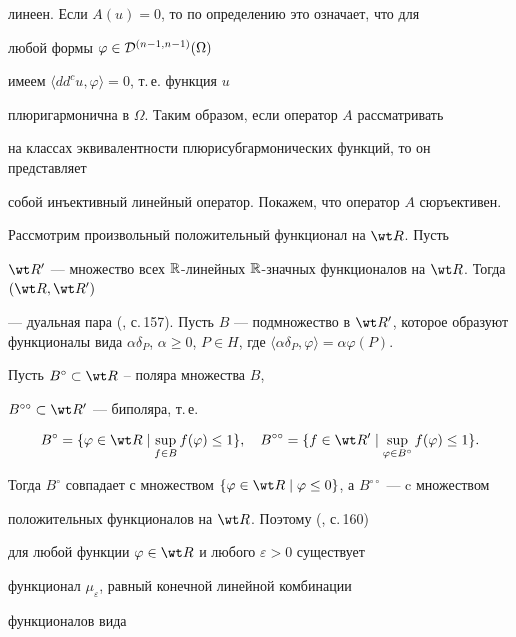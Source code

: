 \begin{pf}
линеен. Если $A(u)=0$, то по определению это означает, что для 


любой формы $\varphi\in {\cal D}^{(n-1,n-1)}(\Omega)$


имеем $\langle dd^cu, \varphi\rangle=0$, т.\,е. функция $u$ 


плюригармонична в $\Omega$. Таким образом, если оператор $A$ рассматривать 


на классах эквивалентности плюрисубгармонических функций, то он представляет 


собой инъективный линейный оператор. Покажем, что оператор $A$ сюръективен. 


Рассмотрим произвольный положительный функционал на $\wt R$. Пусть 


$\wt R^\prime$ --- множество всех $\Bbb R$-линейных $\Bbb 


R$-значных функционалов на $\wt R$. Тогда $(\wt R,\wt R^\prime)$ 


--- дуальная пара (\cite{Schaef}, с.\,157). Пусть $B$ --- подмножество в $\wt 


R^\prime$, которое образуют функционалы вида $\alpha\delta_P$, $\alpha\ge 


0$, $P\in H$, где $\langle\alpha\delta_P,\varphi\rangle=\alpha\varphi(P)$. 


Пусть $B^{\circ}\subset \wt R$ -- поляра множества $B$, 


$B^{\circ\circ}\subset


\wt R^\prime$ --- биполяра, т.\,е.


$$


B^\circ=\{\varphi\in\wt R\mid \sup\limits_{f\in B}f(\varphi)\le 


1\},\quad


B^{\circ\circ}=\{f\in\wt R^\prime\mid \sup\limits_{\varphi\in 


B^{\circ}}f(\varphi)\le 1\}.


$$


Тогда $B^{\circ}$ совпадает с множеством $\left\{\varphi\in\wt 


R\mid \varphi\le 0\right\}$, а $B^{\circ\circ}$ --- c множеством 


положительных функционалов на $\wt R$. Поэтому (\cite{Schaef}, с.\,160)


для любой функции $\varphi\in\wt R$ и любого $\varepsilon>0$ существует 


функционал $\mu_{\varepsilon}$, равный конечной линейной комбинации 


функционалов вида



\end{pf}
